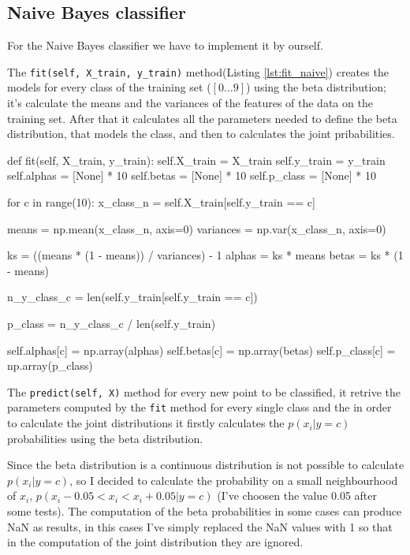 \documentclass[12pt]{article}
\begin{document}
\subsection{Naive Bayes classifier}

For the Naive Bayes classifier we have to implement it by ourself.

The \verb|fit(self, X_train, y_train)| method(Listing \ref{lst:fit_naive}) creates 
the models for every class of the
training set ($[0 \dots 9]$) using the beta distribution; it's calculate the means
and the variances of the features of the data on the training set. After that it
calculates all the parameters needed to define the beta distribution, that models the 
class, and then to calculates the joint pribabilities.

\begin{python}[caption={Naive Bayes fit method},label={lst:fit_naive}]
def fit(self, X_train, y_train):
    self.X_train = X_train
    self.y_train = y_train
    self.alphas = [None] * 10
    self.betas = [None] * 10
    self.p_class = [None] * 10

    for c in range(10):
        x_class_n = self.X_train[self.y_train == c]

        means = np.mean(x_class_n, axis=0)
        variances = np.var(x_class_n, axis=0)            
        
        ks = ((means * (1 - means)) / variances) - 1
        alphas = ks * means
        betas = ks * (1 - means)

        n_y_class_c = len(self.y_train[self.y_train == c])

        p_class = n_y_class_c / len(self.y_train)

        self.alphas[c] = np.array(alphas)
        self.betas[c] = np.array(betas)
        self.p_class[c] = np.array(p_class)
\end{python}

The \verb|predict(self, X)| method for every new point to be classified, it retrive
the parameters computed by the \verb|fit| method for every single class and the in 
order to calculate the joint distributions it firstly calculates the $p(x_i|y=c)$ 
probabilities using the beta distribution. 

Since the beta distribution is a continuous
distribution is not possible to calculate $p(x_i|y=c)$, so I decided to calculate
the probability on a small neighbourhood of $x_i$, $p( x_i-0.05<x_i<x_i+0.05 | y=c)$ 
(I've choosen the value 0.05 after some tests). 
The computation of the beta probabilities in some cases can produce NaN as results, 
in this cases I've simply replaced the NaN values with 1 so that in the computation
of the joint distribution they are ignored.
\end{document}
